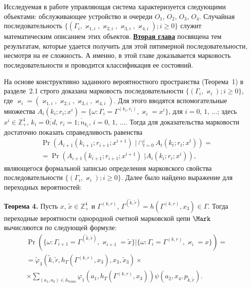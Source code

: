 Исследуемая в работе управляющая система характеризуется следующими объектами:  обслуживающее устройство и очереди $O_1$, $O_2$, $O_3$, $O_4$. Случайная последовательность 
 $\{(\Gamma_i,  \varkappa_{1, i},  \varkappa_{2, i},  \varkappa_{3, i},   \varkappa_{4, i}); i \geqslant 0\}$ служит математическим описанием этих объектов. \underline{\textbf{Вторая глава}} посвящена тем результатам,  которые удается получить для этой пятимерной последовательности, несмотря на ее сложность. А именно, в этой главе доказывается марковость последовательности и проводится классификация ее состояний.

 На основе конструктивно заданного вероятностного пространства (Теорема~1) в  разделе~2.1  строго доказана марковость последовательности  $\{(\Gamma_i,   \varkappa_{i}); i \geqslant 0\}$, где $\varkappa_i = ( \varkappa_{1, i},  \varkappa_{2, i},  \varkappa_{3, i},   \varkappa_{4, i})$. Для этого вводятся вспомогательные множества $
A_i(k_i;r_i;x^i) = \{\omega\colon\Gamma_i=\Gamma^{(k_i, r_i)},  \varkappa_i=x^i\}$, для $i=0$,  $1$,  $\ldots$; здесь  $x^i \in \mathbb{Z}_+^4$,  $k_i=\overline{0;d}$,  $r_i=\overline{1;n_{k_i}}$,  $i=0$,  $1$,  $\ldots$. Тогда для доказательства марковости достаточно показать справедливость равенства
\begin{multline}
\Pr ( A_{i+1}(k_{i+1};r_{i+1};x^{i+1})\, \,  |\cap_{t=0}^{i} A_t(k_t;r_t;x^{t})) = \\ = \Pr ( A_{i+1}(k_{i+1};r_{i+1};x^{i+1})\, \,   |A_i(k_i;r_i;x^{i})),
\label{markovToProve}
\end{multline}
являющегося формальной записью определения марковского свойства последовательности  $\{(\Gamma_i,   \varkappa_{i}); i \geqslant 0\}$. Далее было найдено выражение для переходных вероятностей:

\textbf{Теорема 4.}
Пусть $x$,   $\tilde{x}\in \mathbb{Z}_+^4$ и $\Gamma^{(k,  r)}$,   $\Gamma^{(\tilde{k},  \tilde{r})}=h(\Gamma^{(k,  r)},  x_3) \in \Gamma$. Тогда переходные вероятности однородной счетной марковской цепи $\Mark$ вычисляются по следующей формуле:
\begin{multline}
\Pr (\{\omega\colon \Gamma_{i+1}=\Gamma^{(\tilde{k},  \tilde{r})},  \varkappa_{i+1}=\tilde{x} \}| \{\omega\colon \Gamma_{i}=\Gamma^{(k,  r)},  \varkappa_i=x\})=\\ 
=\widetilde{\varphi}_3(\tilde{k},  \tilde{r},  h_T(\Gamma^{(k,  r)},  x_3),  x_3,  \tilde{x}_3)\times \\ \times
\sum_{(a_1,  a_2)\in {\mathbb A}_{\mathrm{trans}}}\varphi_1(a_1,  h_T(\Gamma^{(k,  r)},  x_3))  \psi(a_2,  x_4,   p_{\tilde{k},  \tilde{r}}).
\label{transitionToProve}
\end{multline}

